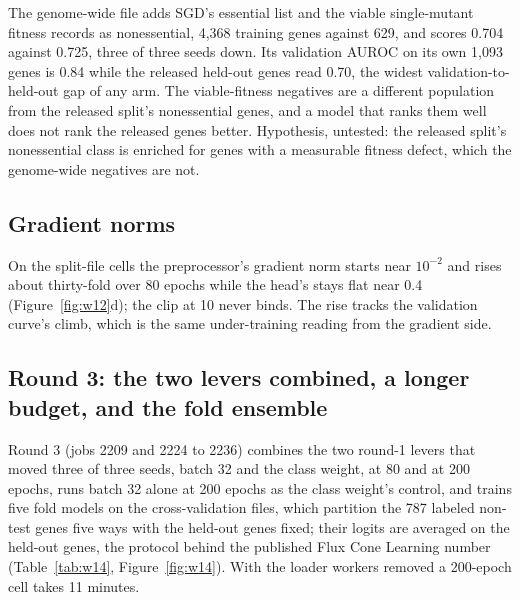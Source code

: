 The genome-wide file adds SGD's essential list and the viable single-mutant fitness records
as nonessential, 4,368 training genes against 629, and scores 0.704 against 0.725, three of
three seeds down. Its validation AUROC on its own 1,093 genes is 0.84 while the released
held-out genes read 0.70, the widest validation-to-held-out gap of any arm. The
viable-fitness negatives are a different population from the released split's nonessential
genes, and a model that ranks them well does not rank the released genes better.
Hypothesis, untested: the released split's nonessential class is enriched for genes with a
measurable fitness defect, which the genome-wide negatives are not.

\subsection{Gradient norms}

On the split-file cells the preprocessor's gradient norm starts near $10^{-2}$ and rises
about thirty-fold over 80 epochs while the head's stays flat near 0.4
(Figure~\ref{fig:w12}d); the clip at 10 never binds. The rise tracks the validation curve's
climb, which is the same under-training reading from the gradient side.

\subsection{Round 3: the two levers combined, a longer budget, and the fold ensemble}

Round 3 (jobs 2209 and 2224 to 2236) combines the two round-1 levers that moved three of
three seeds, batch 32 and the class weight, at 80 and at 200 epochs, runs batch 32 alone at
200 epochs as the class weight's control, and trains five fold models on the
cross-validation files, which partition the 787 labeled non-test genes five ways with the
held-out genes fixed; their logits are averaged on the held-out genes, the protocol behind
the published Flux Cone Learning number (Table~\ref{tab:w14}, Figure~\ref{fig:w14}). With
the loader workers removed a 200-epoch cell takes 11 minutes.




